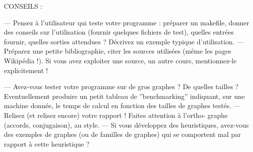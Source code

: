 \documentclass[a4paper, 11pt, oneside]{article}
\begin{document}
CONSEILS :

— Pensez à l’utilisateur qui teste votre programme : préparer un makefile,
donner des conseils sur l’utilisation (fournir quelques fichiers de test),
quelles entrées fournir, quelles sorties attendues ? Décrivez un exemple
typique d’utilisation.
— Préparez une petite bibliographie, citer les sources utilisées (même les
pages Wikipédia !). Si vous avez exploiter une source, un autre cours,
mentionnez-le explicitement !

— Avez-vous tester votre programme sur de gros graphes ? De quelles
tailles ? Eventuellement produire un petit tableau de ”benchmarking”
indiquant, sur une machine donnée, le temps de calcul en fonction des
tailles de graphes testés.
— Relisez (et relisez encore) votre rapport ! Faites attention à l’ortho-
graphe (accords, conjugaison), au style.
— Si vous développez des heuristiques, avez-vous des exemples de graphes
(ou de familles de graphes) qui se comportent mal par rapport à cette
heuristique ?
\end{document}
